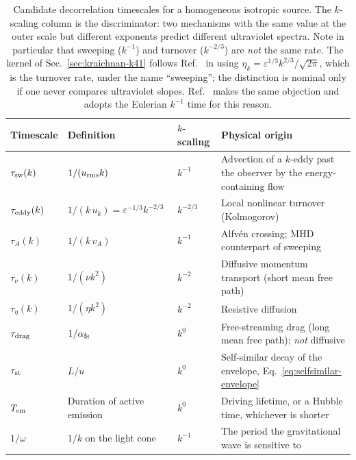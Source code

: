 \documentclass[10pt,prd,aps,nobibnotes,superscriptaddress,preprintnumbers,notitlepage]{revtex4-1}
\begin{document}
\begin{table}[ht]
  \centering
  \begin{tabular}{@{}p{} p{} p{} p{}@{}}
  \hline\hline
  Timescale & Definition & $k$-scaling & Physical origin \\
  \hline
  $\tau_{\rm sw}(k)$   & $1/(u_{\rm rms}k)$ & $k^{-1}$ &
    Advection of a $k$-eddy past the observer by the energy-containing flow
    \cite{Kraichnan:1964,Tennekes:1975,He:2017} \\
  $\tau_{\rm eddy}(k)$ & $1/(k\,u_k)=\varepsilon^{-1/3}k^{-2/3}$ & $k^{-2/3}$ &
    Local nonlinear turnover (Kolmogorov) \cite{Pope:2000,MoninYaglom:1975} \\
  $\tau_A(k)$          & $1/(k\,v_A)$ & $k^{-1}$ &
    Alfv\'en crossing; MHD counterpart of sweeping
    \cite{Kraichnan:1965ik,Goldreich:1994zz,Schekochihin:2020aqu} \\
  $\tau_\nu(k)$        & $1/(\nu k^{2})$ & $k^{-2}$ &
    Diffusive momentum transport (short mean free path) \\
  $\tau_\eta(k)$       & $1/(\eta k^{2})$ & $k^{-2}$ &
    Resistive diffusion \\
  $\tau_{\rm drag}$    & $1/\alpha_{\rm fs}$ & $k^{0}$ &
    Free-streaming drag (long mean free path); \emph{not} diffusive
    \cite{Jedamzik:1996wp,Subramanian:1997gi,Banerjee:2004df} \\
  $\tau_{\rm st}$      & $L/u$ & $k^{0}$ &
    Self-similar decay of the envelope, Eq.~\eqref{eq:selfsimilar-envelope} \\
  $T_{\rm em}$         & Duration of active emission & $k^{0}$ &
    Driving lifetime, or a Hubble time, whichever is shorter \\
  $1/\omega$           & $1/k$ on the light cone & $k^{-1}$ &
    The period the gravitational wave is sensitive to \\
  \hline\hline
  \end{tabular}
  \caption{Candidate decorrelation timescales for a homogeneous isotropic source.
  The $k$-scaling column is the discriminator: two mechanisms with the same value
  at the outer scale but different exponents predict different ultraviolet
  spectra. Note in particular that sweeping ($k^{-1}$) and turnover ($k^{-2/3}$)
  are \emph{not} the same rate. The kernel of Sec.~\ref{sec:kraichnan-k41}
  follows Ref.~\cite{Gogoberidze:2007an} in using
  $\eta_k=\varepsilon^{1/3}k^{2/3}/\sqrt{2\pi}$, which is the turnover rate,
  under the name ``sweeping''; the distinction is nominal only if one never
  compares ultraviolet slopes. Ref.~\cite{Niksa:2018ofa} makes the same objection
  and adopts the Eulerian $k^{-1}$ time for this reason.}
  \label{tab:timescales}
\end{table}
\end{document}

